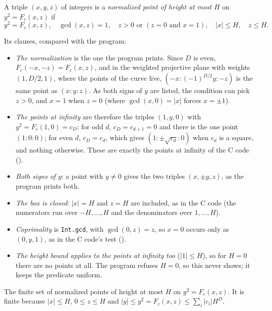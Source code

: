 \begin{definition}\label{def:IsPoint}
  \leanok
  A triple $(x, y, z)$ of integers is a
  \emph{normalized point of height at most $H$} on $y^2 = F_c(x, z)$ if
  \[ y^2 = F_c(x, z), \quad \gcd(x, z) = 1, \quad z > 0 \text{ or } (z = 0 \text{ and } x = 1),
     \quad |x| \le H, \quad z \le H. \]
\end{definition}

Its clauses, compared with the program:
\begin{itemize}
  \item \emph{The normalization} is the one the program prints. Since $D$ is even,
    $F_c(-x, -z) = F_c(x, z)$, and in the weighted projective plane with weights $(1, D/2, 1)$,
    where the points of the curve live, $(-x : (-1)^{D/2} y : -z)$ is the same point as
    $(x : y : z)$. As both signs of $y$ are listed, the condition can pick $z > 0$, and $x = 1$
    when $z = 0$ (where $\gcd(x, 0) = |x|$ forces $x = \pm 1$).
  \item \emph{The points at infinity} are therefore the triples $(1, y, 0)$ with
    $y^2 = F_c(1, 0) = c_D$: for odd $d$, $c_D = c_{d+1} = 0$ and there is the one point
    $(1 : 0 : 0)$; for even $d$, $c_D = c_d$, which gives $(1 : \pm\sqrt{c_d} : 0)$ when $c_d$ is a
    square, and nothing otherwise. These are exactly the points at infinity of the C code
    ().
  \item \emph{Both signs of $y$}: a point with $y \ne 0$ gives the two triples $(x, \pm y, z)$,
    as the program prints both.
  \item \emph{The box is closed}: $|x| = H$ and $z = H$ are included, as in the C code (the
    numerators run over $-H, \dots, H$ and the denominators over $1, \dots, H$).
  \item \emph{Coprimality} is \verb|Int.gcd|, with $\gcd(0, z) = z$, so $x = 0$ occurs only as
    $(0, y, 1)$, as in the C code's test ().
  \item \emph{The height bound applies to the points at infinity too} ($|1| \le H$), so for
    $H = 0$ there are no points at all. The program refuses $H = 0$, so this never shows; it
    keeps the predicate uniform.
\end{itemize}

\begin{definition}\label{def:points}
  \leanok
  The finite set of normalized points of height at most $H$ on
  $y^2 = F_c(x, z)$. It is finite because $|x| \le H$, $0 \le z \le H$ and
  $|y| \le y^2 = F_c(x, z) \le \sum_i |c_i| H^D$.
\end{definition}


